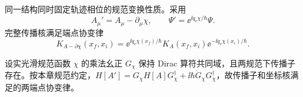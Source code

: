 同一结构同时固定轨迹相位的规范变换性质。采用
\begin{equation}
{
A_\mu' = A_\mu-\partial_\mu\chi,
\qquad
\Psi' = \ee^{\ii q_{\mathrm e}\chi/\hbar}\Psi.}
\label{eq:external_field_gauge_transformation}
\end{equation}
完整传播核满足端点协变律
\begin{equation}
{
K_{A-\partial\chi}(x_f,x_i)
=\ee^{\ii q_{\mathrm e}\chi(x_f)/\hbar}
K_A(x_f,x_i)
\ee^{-\ii q_{\mathrm e}\chi(x_i)/\hbar}.}
\label{eq:exact_dirac_kernel_gauge_covariance}
\end{equation}

\begin{theorem}[时间依赖规范变换的端点协变性]
设实光滑规范函数 $\chi$ 的乘法幺正 $G_\chi$ 保持 Dirac 算符共同域，且两规范下传播子存在。按本章规范约定，$H[A\prime]=G_\chi H[A]G_\chi^\dagger+\ii\hbar\dot G_\chi G_\chi^\dagger$，故传播子和坐标核满足的两端点协变律。
\end{theorem}
